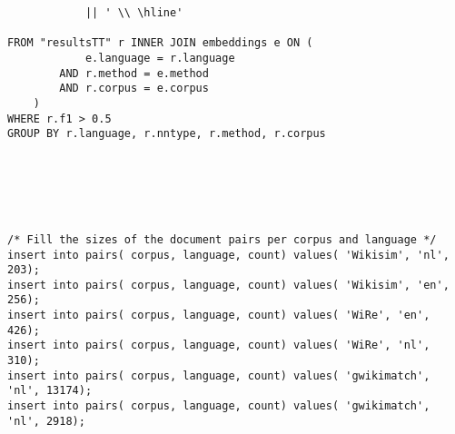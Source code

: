 \begin{verbatim}
            || ' \\ \hline'

FROM "resultsTT" r INNER JOIN embeddings e ON (
            e.language = r.language
        AND r.method = e.method
        AND r.corpus = e.corpus
    )
WHERE r.f1 > 0.5
GROUP BY r.language, r.nntype, r.method, r.corpus






/* Fill the sizes of the document pairs per corpus and language */
insert into pairs( corpus, language, count) values( 'Wikisim', 'nl', 203);
insert into pairs( corpus, language, count) values( 'Wikisim', 'en', 256);
insert into pairs( corpus, language, count) values( 'WiRe', 'en', 426);
insert into pairs( corpus, language, count) values( 'WiRe', 'nl', 310);
insert into pairs( corpus, language, count) values( 'gwikimatch', 'nl', 13174);
insert into pairs( corpus, language, count) values( 'gwikimatch', 'nl', 2918);
\end{verbatim}



